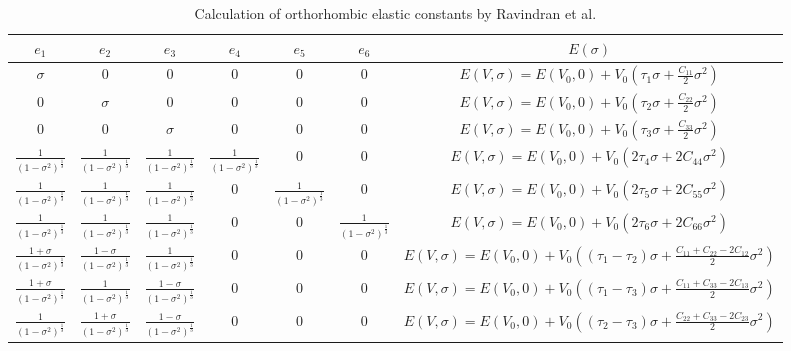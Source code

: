 \renewcommand{\arraystretch}{1.7}
\begin{table}[!htbp]
\centering
\begin{tabular}{c c c c c c c}
\hline\hline
$e_1$ & $e_2$ & $e_3$ & $e_4$ & $e_5$ & $e_6$ & $E(\sigma)$ \\
\hline\hline
$\sigma$ & 0 & 0 & 0 & 0 & 0 &  $E(V,\sigma) = E(V_0, 0) + V_0 \left( \tau_1 \sigma + \frac{C_{11}}{2} \sigma^2 \right) $ \\
0 & $\sigma$ & 0 & 0 & 0 & 0 &  $E(V,\sigma) = E(V_0, 0) + V_0 \left( \tau_2 \sigma + \frac{C_{22}}{2} \sigma^2 \right) $ \\
0 & 0 & $\sigma$ & 0 & 0 & 0 &  $E(V,\sigma) = E(V_0, 0) + V_0 \left( \tau_3 \sigma + \frac{C_{33}}{2} \sigma^2 \right) $ \\
$\frac{1}{(1-\sigma^2)^{\frac{1}{3}}}$ & $\frac{1}{(1-\sigma^2)^{\frac{1}{3}}}$ & $\frac{1}{(1-\sigma^2)^{\frac{1}{3}}}$ & $\frac{1}{(1-\sigma^2)^{\frac{1}{3}}}$ & 0 & 0 &  $E(V,\sigma) = E(V_0, 0) + V_0 \left(2 \tau_4 \sigma + 2 C_{44} \sigma^2 \right) $ \\
$\frac{1}{(1-\sigma^2)^{\frac{1}{3}}}$ & $\frac{1}{(1-\sigma^2)^{\frac{1}{3}}}$ & $\frac{1}{(1-\sigma^2)^{\frac{1}{3}}}$ & 0 & $\frac{1}{(1-\sigma^2)^{\frac{1}{3}}}$ & 0 &  $E(V,\sigma) = E(V_0, 0) + V_0 \left(2 \tau_5 \sigma + 2 C_{55} \sigma^2 \right) $ \\
$\frac{1}{(1-\sigma^2)^{\frac{1}{3}}}$ & $\frac{1}{(1-\sigma^2)^{\frac{1}{3}}}$ & $\frac{1}{(1-\sigma^2)^{\frac{1}{3}}}$ & 0 & 0 & $\frac{1}{(1-\sigma^2)^{\frac{1}{3}}}$ &  $E(V,\sigma) = E(V_0, 0) + V_0 \left(2 \tau_6 \sigma + 2 C_{66} \sigma^2 \right) $ \\
$\frac{1+\sigma}{(1 - \sigma^2)^{\frac{1}{3}}}$ & $\frac{1-\sigma}{(1 - \sigma^2)^{\frac{1}{3}}}$ & $\frac{1}{(1 - \sigma^2)^{\frac{1}{3}}}$ & 0 & 0 & 0 &  $E(V,\sigma) = E(V_0, 0) + V_0 \left( (\tau_1 - \tau_2) \sigma + \frac{C_{11} + C_{22} - 2 C_{12} }{2} \sigma^2 \right) $ \\
$\frac{1+\sigma}{(1 - \sigma^2)^{\frac{1}{3}}}$ & $\frac{1}{(1 - \sigma^2)^{\frac{1}{3}}}$ & $\frac{1-\sigma}{(1 - \sigma^2)^{\frac{1}{3}}}$ & 0 & 0 & 0 &  $E(V,\sigma) = E(V_0, 0) + V_0 \left( (\tau_1 - \tau_3) \sigma + \frac{C_{11} + C_{33} - 2 C_{13} }{2} \sigma^2 \right) $ \\
$\frac{1}{(1 - \sigma^2)^{\frac{1}{3}}}$ & $\frac{1+\sigma}{(1 - \sigma^2)^{\frac{1}{3}}}$ & $\frac{1-\sigma}{(1 - \sigma^2)^{\frac{1}{3}}}$ & 0 & 0 & 0 &  $E(V,\sigma) = E(V_0, 0) + V_0 \left( (\tau_2 - \tau_3) \sigma + \frac{C_{22} + C_{33} - 2 C_{23} }{2} \sigma^2 \right) $ \\
\end{tabular}
\label{tab:multicol}
\caption{Calculation of orthorhombic elastic constants by Ravindran et al.\cite{dfttisiravindran}}
\end{table}


